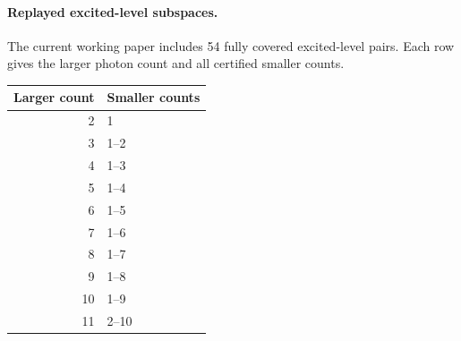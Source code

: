 \paragraph{Replayed excited-level subspaces.}
The current working paper includes 54 fully covered excited-level pairs.
Each row gives the larger photon count and all certified smaller counts.
\begin{center}\begin{tabular}{rl}Larger count & Smaller counts\\\hline
2 & 1 \\
3 & 1--2 \\
4 & 1--3 \\
5 & 1--4 \\
6 & 1--5 \\
7 & 1--6 \\
8 & 1--7 \\
9 & 1--8 \\
10 & 1--9 \\
11 & 2--10 \\
\end{tabular}\end{center}
